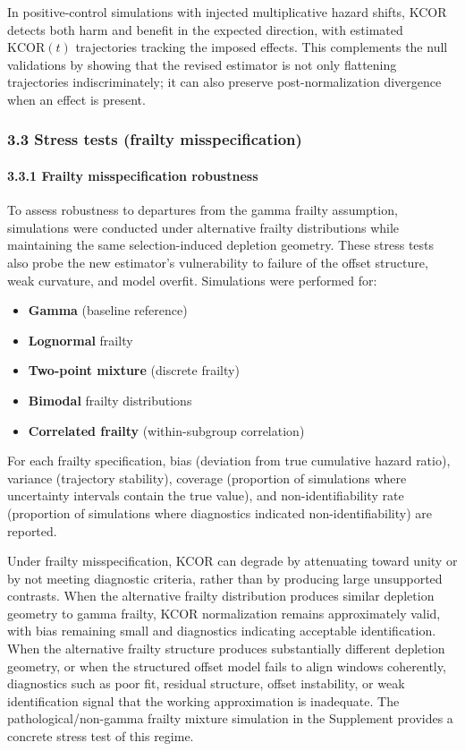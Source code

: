 \documentclass[
]{article}
\providecommand{\tightlist}{%
  \setlength{\itemsep}{0pt}\setlength{\parskip}{0pt}}
\begin{document}
In positive-control simulations with injected multiplicative hazard
shifts, KCOR detects both harm and benefit in the expected direction,
with estimated \(\mathrm{KCOR}(t)\) trajectories tracking the imposed
effects. This complements the null validations by showing that the
revised estimator is not only flattening trajectories indiscriminately;
it can also preserve post-normalization divergence when an effect is
present.

\subsubsection{3.3 Stress tests (frailty
misspecification)}\label{stress-tests-frailty-misspecification}

\paragraph{3.3.1 Frailty misspecification
robustness}\label{frailty-misspecification-robustness}

To assess robustness to departures from the gamma frailty assumption,
simulations were conducted under alternative frailty distributions while
maintaining the same selection-induced depletion geometry. These stress
tests also probe the new estimator's vulnerability to failure of the
offset structure, weak curvature, and model overfit. Simulations were
performed for:

\begin{itemize}
\tightlist
\item
  \textbf{Gamma} (baseline reference)
\item
  \textbf{Lognormal} frailty
\item
  \textbf{Two-point mixture} (discrete frailty)
\item
  \textbf{Bimodal} frailty distributions
\item
  \textbf{Correlated frailty} (within-subgroup correlation)
\end{itemize}

For each frailty specification, bias (deviation from true cumulative
hazard ratio), variance (trajectory stability), coverage (proportion of
simulations where uncertainty intervals contain the true value), and
non-identifiability rate (proportion of simulations where diagnostics
indicated non-identifiability) are reported.

Under frailty misspecification, KCOR can degrade by attenuating toward
unity or by not meeting diagnostic criteria, rather than by producing
large unsupported contrasts. When the alternative frailty distribution
produces similar depletion geometry to gamma frailty, KCOR normalization
remains approximately valid, with bias remaining small and diagnostics
indicating acceptable identification. When the alternative frailty
structure produces substantially different depletion geometry, or when
the structured offset model fails to align windows coherently,
diagnostics such as poor fit, residual structure, offset instability, or
weak identification signal that the working approximation is inadequate.
The pathological/non-gamma frailty mixture simulation in the Supplement
provides a concrete stress test of this regime.
\end{document}

